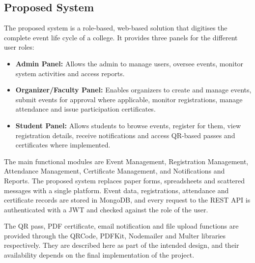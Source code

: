 \documentclass[12pt,a4paper]{report}
\begin{document}
\subsection{Proposed System}
The proposed system is a role-based, web-based solution that digitises the complete event life cycle of a college. It provides three panels for the different user roles:

\begin{itemize}
\item \textbf{Admin Panel:} Allows the admin to manage users, oversee events, monitor system activities and access reports.
\item \textbf{Organizer/Faculty Panel:} Enables organizers to create and manage events, submit events for approval where applicable, monitor registrations, manage attendance and issue participation certificates.
\item \textbf{Student Panel:} Allows students to browse events, register for them, view registration details, receive notifications and access QR-based passes and certificates where implemented.
\end{itemize}

The main functional modules are Event Management, Registration Management, Attendance Management, Certificate Management, and Notifications and Reports. The proposed system replaces paper forms, spreadsheets and scattered messages with a single platform. Event data, registrations, attendance and certificate records are stored in MongoDB, and every request to the REST API is authenticated with a JWT and checked against the role of the user.

The QR pass, PDF certificate, email notification and file upload functions are provided through the QRCode, PDFKit, Nodemailer and Multer libraries respectively. They are described here as part of the intended design, and their availability depends on the final implementation of the project.
\end{document}
